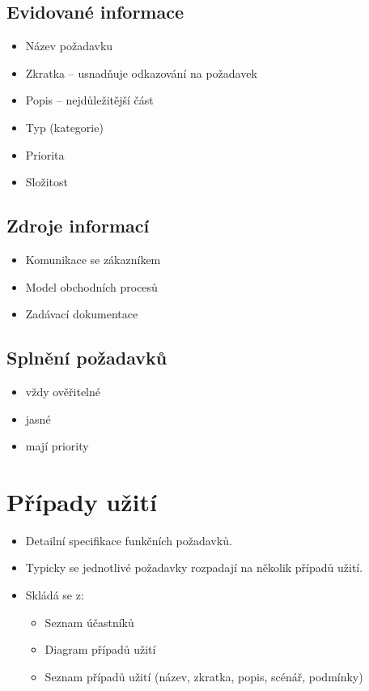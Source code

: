 \documentclass{szzclass}
\begin{document}
\subsection{Evidované informace}
\begin{itemize}
\item Název požadavku
\item Zkratka – usnadňuje odkazování na požadavek
\item Popis – nejdůležitější část
\item Typ (kategorie)
\item Priorita
\item Složitost
\end{itemize}

\subsection{Zdroje informací}
\begin{itemize}
\item Komunikace se zákazníkem
\item Model obchodních procesů
\item Zadávací dokumentace
\end{itemize}

\subsection{Splnění požadavků}
\begin{itemize}
\item vždy ověřitelné
\item jasné
\item mají priority
\end{itemize}


\section{Případy užití}
\begin{itemize}
\item Detailní specifikace funkčních požadavků.
\item Typicky se jednotlivé požadavky rozpadají na několik případů užití.
\item Skládá se z:
  \begin{itemize}
    \item Seznam účastníků
    \item Diagram případů užití
    \item Seznam případů užití (název, zkratka, popis, scénář, podmínky)
  \end{itemize}
\end{itemize}
\end{document}
